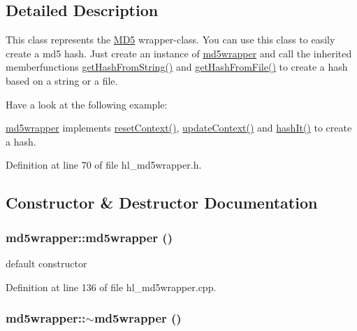\subsection{Detailed Description}
This class represents the \hyperlink{class_m_d5}{MD5} wrapper-\/class. You can use this class to easily create a md5 hash. Just create an instance of \hyperlink{classmd5wrapper}{md5wrapper} and call the inherited memberfunctions \hyperlink{classhashwrapper_aa10904f0dc06eb54771ab26864622d0f}{getHashFromString()} and \hyperlink{classhashwrapper_ae4767e76e6d9e2b24b41f01ab9e7f03c}{getHashFromFile()} to create a hash based on a string or a file.

Have a look at the following example:


\begin{DoxyCodeInclude}
\end{DoxyCodeInclude}


\hyperlink{classmd5wrapper}{md5wrapper} implements \hyperlink{classmd5wrapper_a1e96064bfbb4156962d419f87ad684aa}{resetContext()}, \hyperlink{classmd5wrapper_a6ab84182cd32d43f5fd05bfb68bbc133}{updateContext()} and \hyperlink{classmd5wrapper_ab146103eb1283aaf0a83ae5e8101af26}{hashIt()} to create a hash. 

Definition at line 70 of file hl\_\-md5wrapper.h.

\subsection{Constructor \& Destructor Documentation}
\hypertarget{classmd5wrapper_aae8138b76b89d93a4c21077b76d57c07}{
\subsubsection[{md5wrapper}]{\setlength{\rightskip}{0pt plus 5cm}md5wrapper::md5wrapper ()}}
\label{classmd5wrapper_aae8138b76b89d93a4c21077b76d57c07}


default constructor 

Definition at line 136 of file hl\_\-md5wrapper.cpp.\hypertarget{classmd5wrapper_a65e78258ad508d83be81d395f8bd43f4}{
\subsubsection[{$\sim$md5wrapper}]{\setlength{\rightskip}{0pt plus 5cm}md5wrapper::$\sim$md5wrapper ()}}
\label{classmd5wrapper_a65e78258ad508d83be81d395f8bd43f4}


